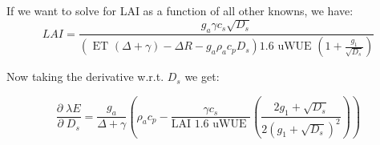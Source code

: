 If we want to solve for LAI as a function of all other knowns, we have:
\begin{equation}
LAI  = \frac{g_a \gamma c_s \sqrt{D_s}}{ \left(\text{ ET } ( \Delta + \gamma) - \Delta R - g_a \rho_a c_p D_{s}\right) 1.6 \text{ uWUE } (1 + \frac{g_1}{\sqrt{D_s}})}
\end{equation}

Now taking the derivative w.r.t. $D_s$ we get:

\begin{equation}
\frac{\partial \;  \lambda E}{\partial \; D_s} = \frac{g_a}{\Delta + \gamma}   \left( \rho_a c_p - \frac{\gamma c_s }{\text{LAI }1.6 \text{ uWUE }} \left( \frac{2 g_1 + \sqrt{D_s}}{2 (g_1 + \sqrt{D_s})^2}\right) \right)
\end{equation}



